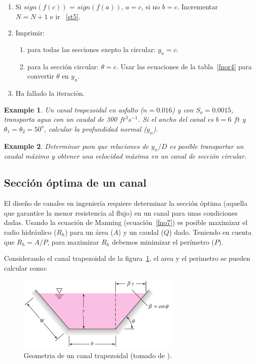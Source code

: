 \documentclass[11pt, oneside]{article}
\newtheorem{exa}{Example}
\begin{document}
\begin{enumerate}
\item \label{st4} Si $sign(f(c))$ = $sign(f(a))$, $a=c$, si no $b=c$. Incrementar $N=N+1$ e ir ~\ref{st5}. 

\item \label{st2} Imprimir:
\begin{enumerate}
\item para todas las secciones exepto la circular: $y_n = c$.
\item para la secci\'on circular: $\theta = c$. Usar las ecuaciones de la tabla~\ref{fnor4} para convertir $\theta$ en $y_n$.
\end{enumerate}


\item \label{st3} Ha fallado la iteraci\'on.

\end{enumerate}

\begin{shaded}
\begin{exa}
Un canal trapezoidal en asfalto ($n=0.016$) y con $S_o = 0.0015$, transporta agua con un caudal de 300 $ft^3 s^{-1}$. Si el ancho del canal es $b=6$ $ft$ y $\theta_1 = \theta_2 = 50^o$, calcular la profundidad normal ($y_n$).
\end{exa}
\end{shaded}

\begin{shaded}
\begin{exa}
Determinar para que relaciones de $y_n /D$ es posible transportar un caudal m\'aximo y obtener una velocidad m\'axima en un canal de secci\'on circular.
\end{exa}
\end{shaded}


\subsection{Secci\'on \'optima de un canal}
El dise\~no de canales en ingenier\'ia requiere determinar la secci\'on \'optima (aquella que garantice la menor resistencia al flujo) en un canal para unas condiciones dadas. Usando la ecuaci\'on de Manning (ecuaci\'on~\ref{fno7}) es posible maximizar el radio hidr\'aulico ($R_h$) para un \'area ($A$) y un caudal ($Q$) dado. Teniendo en cuenta que $R_h = A/P$, para maximizar $R_h$ debemos minimizar el per\'imetro ($P$). 

Considerando el canal trapezoidal de la figura~\ref{fnor6}, el area y el perimetro se pueden calcular como:
\begin{figure}[h!]
\centering
\includegraphics[width=8cm]{fnor6.png}
\caption{Geometria de un canal trapezoidal (tomado de \cite{white1990fluid}).}
\label{fnor6}
\end{figure}
\end{document}
